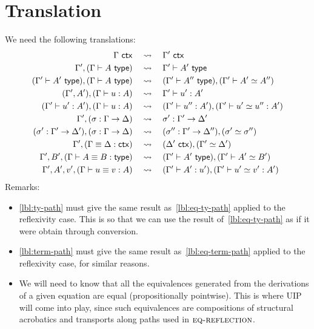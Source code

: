 
\section{Translation}
\label{sec:translation}

We need the following translations:
%
\begin{align}
  \label{lbl:ctx-ctr}
  \Gamma\ \mathsf{ctx}
  &\quad\leadsto\quad
  \Gamma'\ \mathsf{ctx}
  \\
  \label{lbl:ty-ctr}
  \Gamma', (\Gamma \vdash A \ \mathsf{type})
  &\quad\leadsto\quad
  \Gamma' \vdash A' \ \mathsf{type}
  \\
  \label{lbl:ty-path}
  (\Gamma' \vdash A' \ \mathsf{type}), (\Gamma \vdash A \ \mathsf{type})
  &\quad\leadsto\quad
  (\Gamma' \vdash A'' \ \mathsf{type}), (\Gamma' \vdash A' \simeq A'')
  \\
  (\Gamma', A'), (\Gamma \vdash u : A)
  &\quad\leadsto\quad
  \Gamma' \vdash u' : A'
  \\
  \label{lbl:term-path}
  (\Gamma' \vdash u' : A'), (\Gamma \vdash u : A)
  &\quad\leadsto\quad
  (\Gamma' \vdash u'' : A'), (\Gamma' \vdash u' \simeq u'' : A')
  \\
  \Gamma', (\sigma : \Gamma \to \Delta)
  &\quad\leadsto\quad
  \sigma' : \Gamma' \to \Delta'
  \\
  (\sigma' : \Gamma' \to \Delta'), (\sigma : \Gamma \to \Delta)
  &\quad\leadsto\quad
  (\sigma'' : \Gamma' \to \Delta''), (\sigma' \simeq \sigma'')
  \\
  \label{lbl:eq-ctx-path}
  \Gamma', (\Gamma \equiv \Delta : \mathsf{ctx})
  &\quad\leadsto\quad
  (\Delta'\ \mathsf{ctx}), (\Gamma' \simeq \Delta')
  \\
  \label{lbl:eq-ty-path}
  \Gamma', B', (\Gamma \vdash A \equiv B : \mathsf{type})
  &\quad\leadsto\quad
  (\Gamma' \vdash A' \ \mathsf{type}), (\Gamma' \vdash A' \simeq B')
  \\
  \label{lbl:eq-term-path}
  \Gamma', A', v', (\Gamma \vdash u \equiv v : A)
  &\quad\leadsto\quad
  (\Gamma' \vdash A' : u'), (\Gamma' \vdash u' \simeq v' : A')
\end{align}
%
Remarks:
%
\begin{itemize}
\item \eqref{lbl:ty-path} must give the same result as~\eqref{lbl:eq-ty-path} applied to
  the reflexivity case. This is so that we can use the result of~\eqref{lbl:eq-ty-path} as
  if it were obtain through conversion.
\item \eqref{lbl:term-path} must give the same result as~\eqref{lbl:eq-term-path} applied
  to the reflexivity case, for similar reasons.
\item We will need to know that all the equivalences generated from the derivations of a
  given equation are equal (propositionally pointwise). This is where UIP will come into
  play, since such equivalences are compositions of structural acrobatics and transports
  along paths used in $\text{\textsc{eq-reflection}}$.
\end{itemize}




